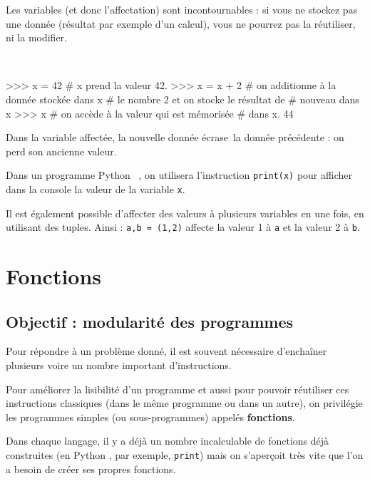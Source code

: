 Les variables (et donc l'affectation) sont incontournables : si vous ne stockez pas une donnée 
(résultat par exemple d'un calcul), vous ne pourrez pas la réutiliser, ni la modifier.



\begin{exemple}~
\begin{pyconsole}
>>> x = 42	# x prend la valeur 42.
>>> x = x + 2	# on additionne à la donnée stockée dans x  
		# le nombre 2 et on stocke le résultat de 
		# nouveau dans x
>>> x 		# on accède à la valeur qui est mémorisée 
		# dans x.
 44
\end{pyconsole}
\end{exemple}

Dans la variable affectée, la nouvelle donnée \og écrase\fg\ la donnée précédente : on perd son 
ancienne valeur.

Dans un programme Python \ , on utilisera l'instruction \texttt{print(x)}
pour afficher dans la console la valeur de la variable \texttt{x}.

Il est également possible d'affecter des valeurs à plusieurs variables en une fois, en utilisant 
des tuples. Ainsi : \texttt{a,b = (1,2)} affecte la valeur 1 à \texttt{a} et la valeur 2 à 
\texttt{b}.




\section{Fonctions}
\subsection{Objectif : modularité des programmes}

Pour répondre à un problème donné, il est souvent nécessaire d'enchaîner plusieurs voire un nombre 
important d'instructions.

Pour améliorer la lisibilité d'un programme et aussi pour pouvoir réutiliser 
ces instructions classiques (dans le même programme ou dans un autre),
on privilégie les programmes simples (ou sous-programmes) appelés \textbf{fonctions}.

Dans chaque langage, il y a déjà un nombre incalculable de fonctions déjà construites (en Python , 
par exemple, \texttt{print}) mais on s'aperçoit très vite que l'on a besoin de créer ses propres 
fonctions.


